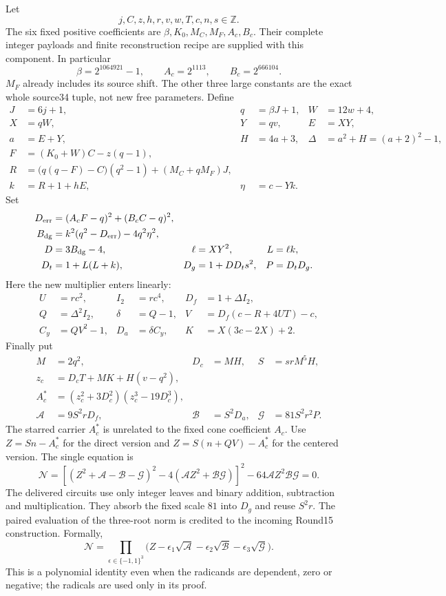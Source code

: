 Let
\[
 j,C,z,h,r,v,w,T,c,n,s\in\mathbb Z.
\]
The six fixed positive coefficients are
$\beta,K_0,M_C,M_F,A_c,B_c$. Their complete integer payloads and finite
reconstruction recipe are supplied with this component. In particular
\[
 \beta=2^{1064921}-1,\qquad A_c=2^{1113},\qquad B_c=2^{666104}.
\]
$M_F$ already includes its source shift. The other three large constants
are the exact whole source34 tuple, not new free parameters.
Define
\begin{align*}
 J&=6j+1,&q&=\beta J+1,&W&=12w+4,\\
 X&=qW,&Y&=qv,&E&=XY,\\
 a&=E+Y,&H&=4a+3,&\Delta&=a^2+H=(a+2)^2-1,\\
 F&=(K_0+W)C-z(q-1),&&&\\
 R&=\bigl(q(q-F)-C\bigr)(q^2-1)+(M_C+qM_F)J,&&&\\
 k&=R+1+hE,&\eta&=c-Yk.&&
\end{align*}
Set
\begin{align*}
 D_{\rm err}&=(A_cF-q)^2+(B_cC-q)^2,\\
 B_{\rm dg}&=k^2(q^2-D_{\rm err})-4q^2\eta^2,\\
 D&=3B_{\rm dg}-4,&\ell&=XY^2,&L&=\ell k,\\
 D_t&=1+L(L+k),&D_g&=1+DD_ts^2,&P&=D_tD_g.
\end{align*}
Here the new multiplier enters linearly:
\begin{align*}
 U&=rc^2,&I_2&=rc^4,&D_f&=1+\Delta I_2,\\
 Q&=\Delta^2I_2,&\delta&=Q-1,&V&=D_f(c-R+4UT)-c,\\
 C_y&=QV^2-1,&D_a&=\delta C_y,&K&=X(3c-2X)+2.
\end{align*}
Finally put
\begin{align*}
 M&=2q^2,&D_c&=MH,&S&=srM^5H,\\
 z_c&=D_cT+MK+H(v-q^2),&&&\\
 A_c^{\ast}&=(z_c^2+3D_c^2)(z_c^3-19D_c^3),&&&\\
 \mathcal A&=9S^2rD_f,&\mathcal B&=S^2D_a,
 &\mathcal G&=81S^2r^2P.
\end{align*}
The starred carrier $A_c^{\ast}$ is unrelated to the fixed cone coefficient
$A_c$. Use $Z=Sn-A_c^{\ast}$ for the direct version and
$Z=S(n+QV)-A_c^{\ast}$ for the centered version. The single equation is
\begin{equation}
 \boxed{\mathcal N=
 \left[(Z^2+\mathcal A-\mathcal B-\mathcal G)^2
       -4(\mathcal AZ^2+\mathcal B\mathcal G)\right]^2
       -64\mathcal AZ^2\mathcal B\mathcal G=0.}
 \label{eq:linear-multiplier-norm}
\end{equation}
The delivered circuits use only integer leaves and binary addition,
subtraction and multiplication. They absorb the fixed scale $81$ into
$D_g$ and reuse $S^2r$. The paired evaluation of the three-root norm is
credited to the incoming Round15 construction. Formally,
\[
 \mathcal N=\prod_{\epsilon\in\{-1,1\}^3}
 \bigl(Z-\epsilon_1\sqrt{\mathcal A}
        -\epsilon_2\sqrt{\mathcal B}
        -\epsilon_3\sqrt{\mathcal G}\bigr).
\]
This is a polynomial identity even when the radicands are dependent,
zero or negative; the radicals are used only in its proof.

